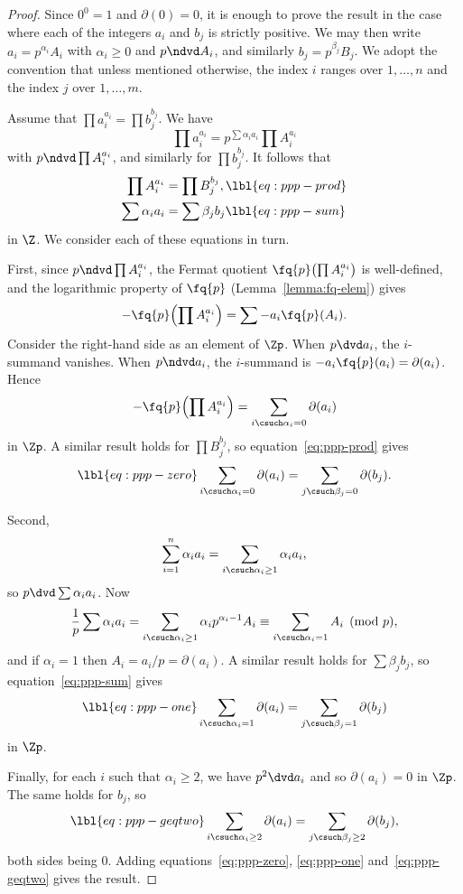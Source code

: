 \begin{proof}
Since $0^0 = 1$ and $\partial(0) = 0$, it is enough to prove the result in
the case where each of the integers $a_i$ and $b_j$ is strictly positive.
We may then write $a_i = p^{\alpha_i} A_i$ with $\alpha_i \geq 0$ and $p
\ndvd A_i$, and similarly $b_j = p^{\beta_j} B_j$.  We adopt the convention
that unless mentioned otherwise, the index $i$ ranges over $1, \ldots, n$
and the index $j$ over $1, \ldots, m$.

Assume that $\prod a_i^{a_i} = \prod b_j^{b_j}$.  We have
\[
\prod a_i^{a_i}
=
p^{\sum \alpha_i a_i} \prod A_i^{a_i}
\]
with $p \ndvd \prod A_i^{a_i}$, and similarly for $\prod b_j^{b_j}$.
It follows that
% 
\begin{align}
\prod A_i^{a_i}       &
=
\prod B_j^{b_j},       
\lbl{eq:ppp-prod}       \\
\sum \alpha_i a_i &
=
\sum \beta_j b_j
\lbl{eq:ppp-sum}        
\end{align}
% 
in $\Z$. We consider each of these equations in turn.

First, since $p \ndvd \prod A_i^{a_i}$, the Fermat quotient
$\fq{p}\bigl(\prod A_i^{a_i}\bigr)$ is well-defined, and the logarithmic
property of $\fq{p}$ (Lemma~\ref{lemma:fq-elem})
gives 
\[
-\fq{p}\Bigl( \prod A_i^{a_i} \Bigr)
=
\sum - a_i \fq{p}(A_i).
\]
Consider the right-hand side as an element of $\Zp$.  When $p \dvd a_i$,
the $i$-summand vanishes.  When $p \ndvd a_i$, the $i$-summand is $-a_i
\fq{p}(a_i) = \partial(a_i)$.  Hence
\[
-\fq{p}\Bigl( \prod A_i^{a_i} \Bigr)
=
\sum_{i \csuch \alpha_i = 0} \partial(a_i)
\]
in $\Zp$.  A similar result holds for $\prod B_j^{b_j}$, so
equation~\eqref{eq:ppp-prod} gives
% 
\begin{equation}
\lbl{eq:ppp-zero}
\sum_{i \csuch \alpha_i = 0} \partial(a_i)
=
\sum_{j \csuch \beta_j = 0} \partial(b_j).
\end{equation}

Second,
\[
\sum_{i = 1}^n \alpha_i a_i 
= 
\sum_{i \csuch \alpha_i \geq 1} \alpha_i a_i,
\]
so $p \dvd \sum \alpha_i a_i$.  Now
\[
\frac{1}{p} \sum \alpha_i a_i 
=
\sum_{i \csuch \alpha_i \geq 1} \alpha_i p^{\alpha_i - 1} A_i
\equiv
\sum_{i \csuch \alpha_i = 1} A_i \pmod{p},
\]
and if $\alpha_i = 1$ then $A_i = a_i/p = \partial(a_i)$.  
A similar result holds for $\sum \beta_j b_j$, so
equation~\eqref{eq:ppp-sum} gives
% 
\begin{equation}
\lbl{eq:ppp-one}
\sum_{i \csuch \alpha_i = 1} \partial(a_i)
=
\sum_{j \csuch \beta_j = 1} \partial(b_j)
\end{equation}
% 
in $\Zp$.

Finally, for each $i$ such that $\alpha_i \geq 2$, we have $p^2 \dvd a_i$
and so $\partial(a_i) = 0$ in $\Zp$.  The same holds for $b_j$, so 
% 
\begin{equation}
\lbl{eq:ppp-geqtwo}
\sum_{i \csuch \alpha_i \geq 2} \partial(a_i)
=
\sum_{j \csuch \beta_j \geq 2} \partial(b_j), 
\end{equation}
% 
both sides being $0$.  Adding equations~\eqref{eq:ppp-zero},
\eqref{eq:ppp-one} and~\eqref{eq:ppp-geqtwo} gives the result.
\end{proof}

